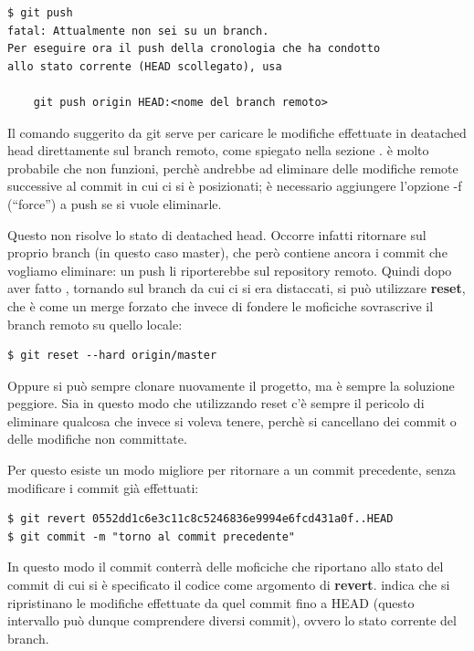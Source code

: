 \documentclass{article}
\begin{document}
\begin{verbatim}
$ git push
fatal: Attualmente non sei su un branch.
Per eseguire ora il push della cronologia che ha condotto
allo stato corrente (HEAD scollegato), usa

    git push origin HEAD:<nome del branch remoto>
\end{verbatim}

Il comando suggerito da git serve per caricare le modifiche effettuate in deatached head
direttamente sul branch remoto, come spiegato nella sezione .
è molto probabile che non funzioni, perchè andrebbe ad
eliminare delle modifiche remote successive al commit in cui ci si è
posizionati; è necessario aggiungere l'opzione -f (``force'') a push se si vuole
eliminarle.

Questo non risolve lo stato di deatached head.
Occorre infatti ritornare sul proprio branch (in questo caso master),
che però contiene ancora i commit che vogliamo eliminare: un push li riporterebbe sul 
repository remoto.
Quindi dopo aver fatto , tornando sul branch da cui ci
si era distaccati, si può utilizzare \textbf{reset}, che è come un merge forzato
che invece di fondere le moficiche sovrascrive il branch remoto su quello locale:

\begin{verbatim}
$ git reset --hard origin/master
\end{verbatim}

Oppure si può sempre clonare nuovamente il progetto, ma è sempre la soluzione
peggiore. Sia in questo modo che utilizzando reset c'è sempre il pericolo di
eliminare qualcosa che invece si voleva tenere, perchè si cancellano dei commit
o delle modifiche non committate.

Per questo esiste un modo migliore per ritornare a un commit precedente, senza
modificare i commit già effettuati:

\begin{verbatim}
$ git revert 0552dd1c6e3c11c8c5246836e9994e6fcd431a0f..HEAD
$ git commit -m "torno al commit precedente"
\end{verbatim}

In questo modo il commit  conterrà delle
moficiche che riportano allo stato del commit di cui si è specificato il codice
come argomento di \textbf{revert}.  indica che si ripristinano le modifiche
effettuate da quel commit fino a HEAD (questo intervallo può dunque comprendere
diversi commit), ovvero lo stato corrente del branch.
\end{document}
